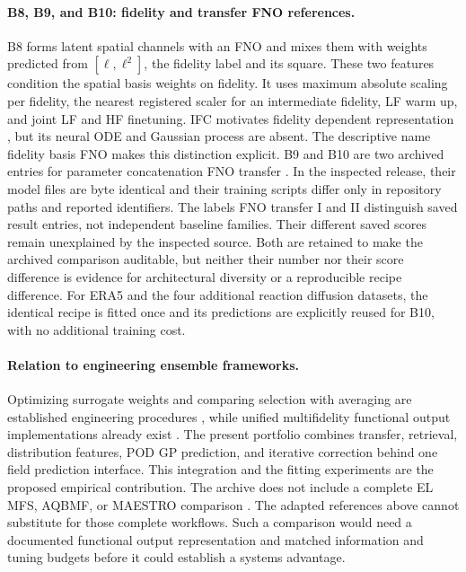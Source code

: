 \paragraph{B8, B9, and B10: fidelity and transfer FNO references.}
B8 forms latent spatial channels with an FNO and mixes them with weights predicted
from $[\ell,\ell^2]$, the fidelity label and its square. These two features
condition the spatial basis weights on fidelity. It uses maximum absolute scaling
per fidelity, the nearest registered scaler for an intermediate fidelity, LF
warm up, and joint LF and HF finetuning. IFC motivates fidelity dependent
representation \citep{li2022ifc}, but its neural ODE and Gaussian process are
absent. The descriptive name fidelity basis FNO makes this distinction explicit.
B9 and B10 are two archived entries for parameter concatenation FNO transfer
\citep{lyu2023}. In the inspected release, their model files are byte identical
and their training scripts differ only in repository paths and reported
identifiers. The labels FNO transfer I and II distinguish saved result entries,
not independent baseline families. Their different saved scores remain
unexplained by the inspected source. Both are retained to make the archived
comparison auditable, but neither their number nor their score difference is
evidence for architectural diversity or a reproducible recipe difference.
For ERA5 and the four additional reaction diffusion datasets, the identical
recipe is fitted once and its predictions are explicitly reused for B10,
with no additional training cost.

\paragraph{Relation to engineering ensemble frameworks.}
Optimizing surrogate weights and comparing selection with averaging are
established engineering procedures \citep{acar2009,viana2009}, while unified
multifidelity functional output implementations already exist
\citep{brunel2025}. The present portfolio combines transfer, retrieval,
distribution features, POD GP prediction, and iterative correction behind one
field prediction interface. This integration and the fitting experiments
are the proposed empirical contribution. The archive does not include a
complete EL MFS, AQBMF, or MAESTRO comparison
\citep{wang2024elmfs,lee2026aqbmf,kim2026maestro}. The adapted references above
cannot substitute for those complete workflows. Such a comparison would need
a documented functional output representation and matched information and
tuning budgets before it could establish a systems advantage.
